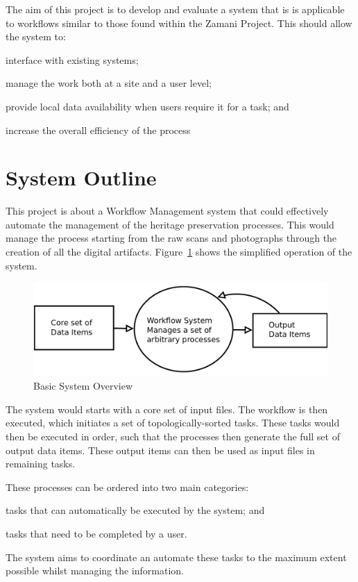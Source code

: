     The aim of this project is to develop and evaluate a system that is is applicable
    to workflows similar to those found within the Zamani Project. This should allow the
    system to: \begin{inparaenum}[i)] \item interface with existing systems; \item manage the
    work both at a site and a user level; \item provide local data availability when users
    require it for a task; and \item increase the overall efficiency of the process
    \end{inparaenum}

\section{System Outline}
    This project is about a Workflow Management system that could effectively
    automate the management of the heritage preservation processes.
	This would manage the process starting from the raw scans and photographs
	through the creation of all the digital artifacts. Figure~\ref{intro:basic}
	shows the simplified operation of the system.
	\begin{figure}[!h]
		\begin{center}
			\includegraphics[scale=0.34]{figures/basic_system.pdf}
		\end{center}
		\caption{Basic System Overview}
		\label{intro:basic}
	\end{figure}

	\noindent The system would starts with a
	core set of input files. The workflow is then executed, which initiates a set
	of topologically-sorted tasks. These tasks would then be executed in order, such that
    the processes then generate the full set of output data items. These output items can then
    be used as input files in remaining tasks.

    These processes can be ordered into two main categories:
    \begin{inparaenum}[(i)]
        \item tasks that can automatically be executed by the system; and
        \item tasks that need to be completed by a user.
    \end{inparaenum} The system aims to coordinate an automate these tasks to
    the maximum extent possible whilst managing the information.

